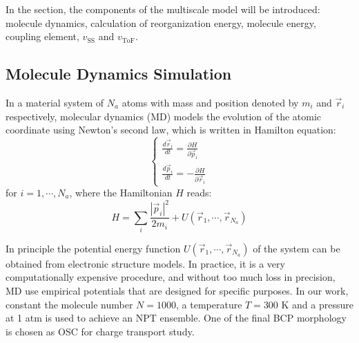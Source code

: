 \documentclass[letterpaper,12pt]{article}
\begin{document}
In the section, the components of the multiscale model will be introduced: molecule dynamics, calculation of reorganization energy, molecule energy, coupling element, $v_\text{SS}$ and $v_\text{ToF}$.

\subsection{Molecule Dynamics Simulation}
In a material system of $N_a$ atoms with mass and position denoted by $m_i$ and $\vec{r}_i$ respectively, molecular dynamics (MD) models the evolution of the atomic coordinate using Newton's second law, which is written in Hamilton equation: 
\begin{equation}
    \begin{cases}
        \frac{d \vec{r}_i}{dt} = \frac{\partial H }{\partial \vec{p}_i} \\
        \frac{d \vec{p}_i}{dt} = -\frac{\partial H }{\partial \vec{r}_i}
    \end{cases}
    \label{eq:Hamilton}
\end{equation}
for $i=1,\cdots,N_a$, where the Hamiltonian $H$ reads:
\begin{equation}
    H=\sum\limits_{i} \frac{|\vec{p}_i|^2}{2 m_i} + U(\vec{r}_1,\cdots,\vec{r}_{N_a})
    \label{eq:Hamilton2}
\end{equation} 

In principle the potential energy function $U(\vec{r}_1,\cdots,\vec{r}_{N_a})$ of the system can be obtained from electronic structure models. In practice, it is a very computationally expensive procedure, and without too much loss in precision, MD use empirical potentials that are designed for specific purposes.
In our work, constant the molecule number $N=1000$, a temperature $T=300$ K and a pressure at 1 atm is used to achieve an NPT ensemble. 
One of the final BCP morphology is chosen as OSC for charge transport study. 

\end{document}
